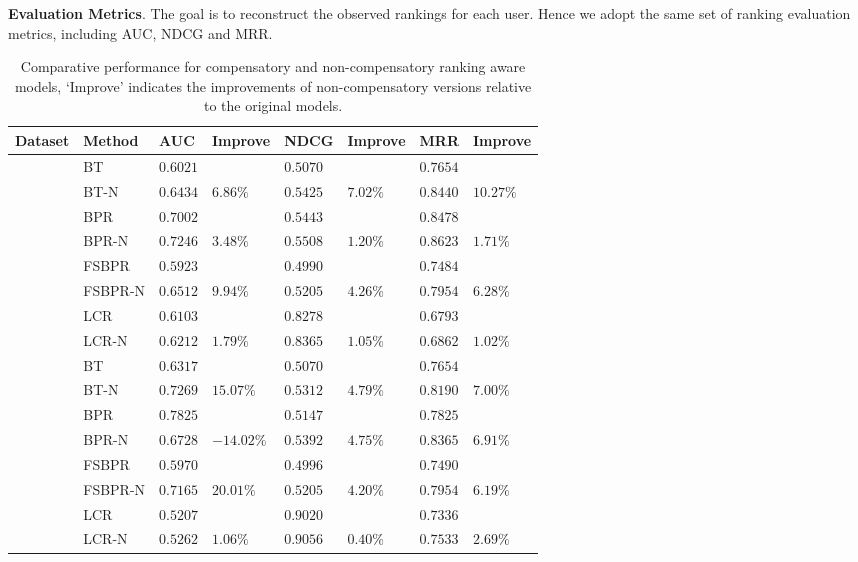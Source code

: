 \documentclass[letterpaper]{article} %
\begin{document}
\textbf{Evaluation Metrics}.  The goal is to reconstruct the observed rankings for each user. Hence we adopt the same set of ranking evaluation metrics, including AUC, NDCG and MRR. 
\begin{table}[htp]
\tiny
\caption{Comparative performance for compensatory and non-compensatory ranking aware models, `Improve' indicates the improvements of non-compensatory versions relative to the original models.}
\begin{center}
\begin{tabular}{p{0.4cm}<{\centering}|p{1.4cm}<{\centering} |p{0.5cm} p{0.6cm} |p{0.5cm} p{0.6cm} |p{0.5cm} p{0.6cm}}
\hline
Dataset	& Method	& AUC	& Improve&	NDCG&	Improve&	MRR	&Improve\\\hline
{} &	BT	& $0.6021$ 	& &	$0.5070$ 	&&	$0.7654$ 	&\\
	&BT-N	&$0.6434$ &	$6.86\%$	&$0.5425 $	&$7.02\%$	&$0.8440$ &	$10.27\%$	\\
	&BPR&	$0.7002$ 	&&	$0.5443$ 	&&	$0.8478$ &\\
	&BPR-N	&$0.7246$ 	&$3.48\%$	&$0.5508$ &	$1.20\%$	&$0.8623$ 	&$1.71\%$	\\
	&FSBPR		&$0.5923$&	&$0.4990$ 	&&	$0.7484$&\\	
	&FSBPR-N	&$0.6512$	&$9.94\%$	&	$0.5205$ 	&$4.26\%$	&$0.7954$ 	&$6.28\%$	\\
	&LCR		&$0.6103$&	&$0.8278$ 	&&	$0.6793$&\\	
	&LCR-N	&$0.6212$	&$1.79\%$	&	$0.8365$ 	&$1.05\%$	&$0.6862$ 	&$1.02\%$ \\

	\hline
{}	&	BT	& $0.6317 $ 	& &	$0.5070$ 	&&	$0.7654$ 	&\\
	&BT-N	&$0.7269$ &	$15.07\%$	&$0.5312 $	&$4.79\%$	&$0.8190$ &	$7.00\%$	\\
	&BPR&	$0.7825$ 	&&	$0.5147$ 	&&	$0.7825$ &\\
	&BPR-N	&$0.6728$ 	&$-14.02\%$	&$0.5392$ &	$4.75\%$	&$0.8365$ 	&$6.91\%$	\\
	&FSBPR		&$0.5970$&	&$0.4996$ 	&&	$0.7490$&\\	
	&FSBPR-N	&$0.7165$	&$20.01\%$	&	$0.5205$ 	&$4.20\%$	&$0.7954$ 	&$6.19\%$	\\
	&LCR		&$0.5207$&	&$0.9020$ 	&&	$0.7336$&\\	
	&LCR-N	&$0.5262$	&$1.06\%$	&	$0.9056$ 	&$0.40\%$	&$0.7533$ 	&$2.69\%$ \\


\end{tabular}
\end{center}
\end{table}
\end{document}
